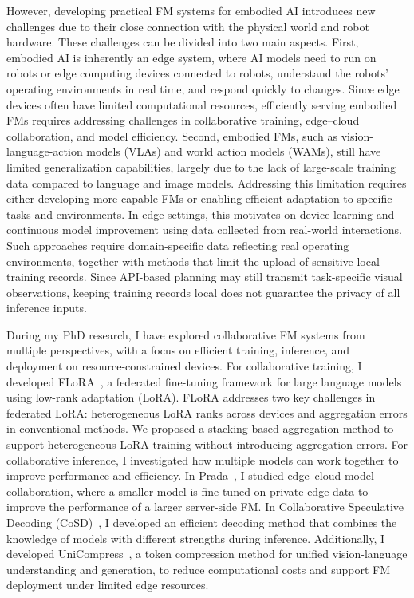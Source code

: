 \documentclass[11pt]{article}
\begin{document}
However, developing practical FM systems for embodied AI introduces new challenges due to their close connection with the physical world and robot hardware. These challenges can be divided into two main aspects. First, embodied AI is inherently an edge system, where AI models need to run on robots or edge computing devices connected to robots, understand the robots' operating environments in real time, and respond quickly to changes. Since edge devices often have limited computational resources, efficiently serving embodied FMs requires addressing challenges in collaborative training, edge--cloud collaboration, and model efficiency. Second, embodied FMs, such as vision-language-action models (VLAs) and world action models (WAMs), still have limited generalization capabilities, largely due to the lack of large-scale training data compared to language and image models. Addressing this limitation requires either developing more capable FMs or enabling efficient adaptation to specific tasks and environments. In edge settings, this motivates on-device learning and continuous model improvement using data collected from real-world interactions. Such approaches require domain-specific data reflecting real operating environments, together with methods that limit the upload of sensitive local training records. Since API-based planning may still transmit task-specific visual observations, keeping training records local does not guarantee the privacy of all inference inputs.

During my PhD research, I have explored collaborative FM systems from multiple perspectives, with a focus on efficient training, inference, and deployment on resource-constrained devices. For collaborative training, I developed FLoRA~\cite{flora2024}, a federated fine-tuning framework for large language models using low-rank adaptation (LoRA). FLoRA addresses two key challenges in federated LoRA: heterogeneous LoRA ranks across devices and aggregation errors in conventional methods. We proposed a stacking-based aggregation method to support heterogeneous LoRA training without introducing aggregation errors. For collaborative inference, I investigated how multiple models can work together to improve performance and efficiency. In Prada~\cite{prada2025}, I studied edge--cloud model collaboration, where a smaller model is fine-tuned on private edge data to improve the performance of a larger server-side FM. In Collaborative Speculative Decoding (CoSD)~\cite{cosd2025}, I developed an efficient decoding method that combines the knowledge of models with different strengths during inference. Additionally, I developed UniCompress~\cite{unicompress2026}, a token compression method for unified vision-language understanding and generation, to reduce computational costs and support FM deployment under limited edge resources.
\end{document}
